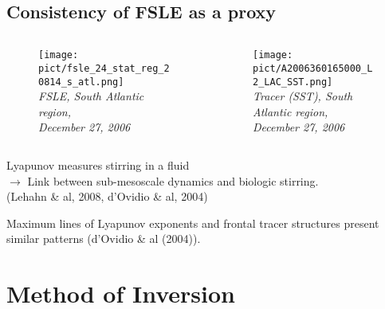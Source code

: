 \documentclass[compress,slidescentered,notes=show]{beamer}
\newcommand{\legende}[1]{\textit{\footnotesize #1}}
\begin{document}
       \subsection{Consistency of FSLE as a proxy}
\begin{frame}
  \begin{columns}
    \begin{column}{0.5\textwidth}
      \begin{figure}%
        \texttt{[image: pict/fsle\_24\_stat\_reg\_20814\_s\_atl.png]}\\
        \legende{FSLE, South Atlantic region, \\December 27, 2006}
      \end{figure}
    \end{column}
    \begin{column}{0.5\textwidth}
      \begin{figure}
        \texttt{[image: pict/A2006360165000\_L2\_LAC\_SST.png]}\\
        \legende{Tracer (SST), South Atlantic region, \\December 27, 2006}
      \end{figure}
    \end{column}
  \end{columns}
  \vspace{0.5cm}
  \begin{block}{}
  Lyapunov measures stirring in a fluid \\
  $\rightarrow$ Link between sub-mesoscale dynamics and biologic stirring. \\
  (Lehahn \& al, 2008, d'Ovidio \& al, 2004)
  \end{block}
  Maximum lines of Lyapunov exponents and frontal tracer structures present similar patterns (d'Ovidio \& al (2004)).

\end{frame}

\section{Method of Inversion}
\end{document}
